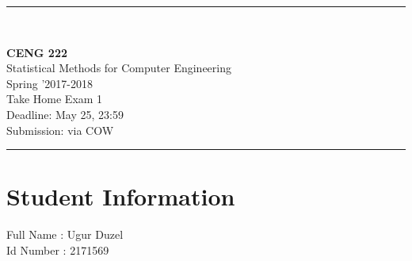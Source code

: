 \documentclass[12pt]{article}
\newcommand{\HRule}{\rule{\linewidth}{1mm}}
\begin{document}
\noindent
\HRule \\[3mm]
\begin{flushright}

                                         \LARGE \textbf{CENG 222}  \\[4mm]
                                         \Large Statistical Methods for Computer Engineering \\[4mm]
                                        \normalsize      Spring '2017-2018 \\
                                           \Large   Take Home Exam 1 \\
                    \normalsize Deadline: May 25, 23:59 \\
                    \normalsize Submission: via COW
\end{flushright}
\HRule

\section*{Student Information }
Full Name :  Ugur Duzel\\
Id Number :  2171569\\

\end{document}
